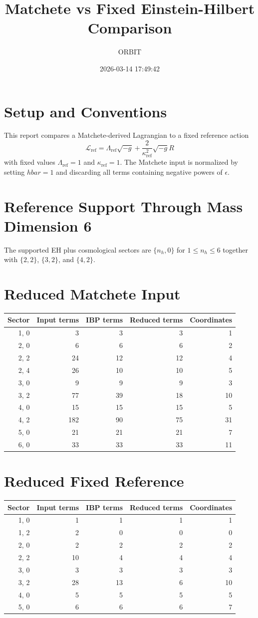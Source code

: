 \documentclass[11pt]{article}
\title{Matchete vs Fixed Einstein-Hilbert Comparison}
\author{ORBIT}
\date{2026-03-14 17:49:42}
\begin{document}
\maketitle
\tableofcontents
\section{Setup and Conventions}
This report compares a Matchete-derived Lagrangian to a fixed reference action
\begin{equation}
\mathcal{L}_{\mathrm{ref}} = \Lambda_{\mathrm{ref}} \sqrt{-g} + \frac{2}{\kappa_{\mathrm{ref}}^2} \sqrt{-g} R
\end{equation}
with fixed values $\Lambda_{\mathrm{ref}} = 1$ and $\kappa_{\mathrm{ref}} = 1$.
The Matchete input is normalized by setting $hbar = 1$ and discarding all terms containing negative powers of $\epsilon$.
\section{Reference Support Through Mass Dimension 6}
The supported EH plus cosmological sectors are $\{n_h, 0\}$ for $1 \le n_h \le 6$ together with $\{2,2\}$, $\{3,2\}$, and $\{4,2\}$.
\section{Reduced Matchete Input}
\begin{longtable}{rrrrr}
\toprule
Sector & Input terms & IBP terms & Reduced terms & Coordinates \\
\midrule
{1, 0} & 3 & 3 & 3 & 1 \\
{2, 0} & 6 & 6 & 6 & 2 \\
{2, 2} & 24 & 12 & 12 & 4 \\
{2, 4} & 26 & 10 & 10 & 5 \\
{3, 0} & 9 & 9 & 9 & 3 \\
{3, 2} & 77 & 39 & 18 & 10 \\
{4, 0} & 15 & 15 & 15 & 5 \\
{4, 2} & 182 & 90 & 75 & 31 \\
{5, 0} & 21 & 21 & 21 & 7 \\
{6, 0} & 33 & 33 & 33 & 11 \\
\bottomrule
\end{longtable}
\section{Reduced Fixed Reference}
\begin{longtable}{rrrrr}
\toprule
Sector & Input terms & IBP terms & Reduced terms & Coordinates \\
\midrule
{1, 0} & 1 & 1 & 1 & 1 \\
{1, 2} & 2 & 0 & 0 & 0 \\
{2, 0} & 2 & 2 & 2 & 2 \\
{2, 2} & 10 & 4 & 4 & 4 \\
{3, 0} & 3 & 3 & 3 & 3 \\
{3, 2} & 28 & 13 & 6 & 10 \\
{4, 0} & 5 & 5 & 5 & 5 \\
{5, 0} & 6 & 6 & 6 & 7 \\
\bottomrule
\end{longtable}
\end{document}
